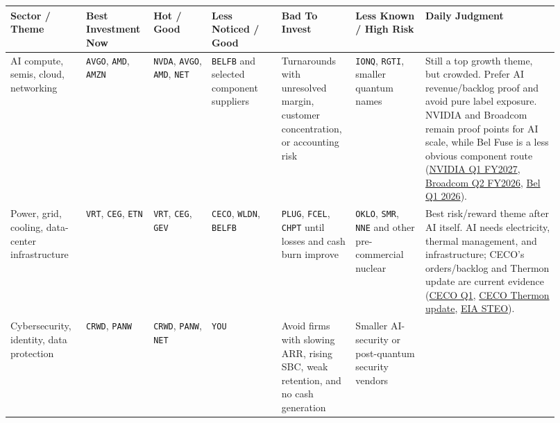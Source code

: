 \documentclass[
  9pt,
]{article}
\begin{document}
\scriptsize
\begin{longtable}[]{@{}L{0.13\linewidth}L{0.10\linewidth}L{0.10\linewidth}L{0.12\linewidth}L{0.12\linewidth}L{0.12\linewidth}L{0.23\linewidth}@{}}
\toprule
Sector / Theme & Best Investment Now & Hot / Good & Less Noticed / Good
& Bad To Invest & Less Known / High Risk & Daily Judgment \\
\midrule
\endhead
AI compute, semis, cloud, networking & \texttt{AVGO}, \texttt{AMD},
\texttt{AMZN} & \texttt{NVDA}, \texttt{AVGO}, \texttt{AMD}, \texttt{NET}
& \texttt{BELFB} and selected component suppliers & Turnarounds with
unresolved margin, customer concentration, or accounting risk &
\texttt{IONQ}, \texttt{RGTI}, smaller quantum names & Still a top growth
theme, but crowded. Prefer AI revenue/backlog proof and avoid pure label
exposure. NVIDIA and Broadcom remain proof points for AI scale, while
Bel Fuse is a less obvious component route
(\href{https://investor.nvidia.com/news/press-release-details/2026/NVIDIA-Announces-Financial-Results-for-First-Quarter-Fiscal-2027/default.aspx}{NVIDIA
Q1 FY2027},
\href{https://investors.broadcom.com/news-releases/news-release-details/broadcom-inc-announces-second-quarter-fiscal-year-2026-financial}{Broadcom
Q2 FY2026},
\href{https://ir.belfuse.com/news-releases/news-release-details/bel-reports-first-quarter-2026-results}{Bel
Q1 2026}). \\
Power, grid, cooling, data-center infrastructure & \texttt{VRT},
\texttt{CEG}, \texttt{ETN} & \texttt{VRT}, \texttt{CEG}, \texttt{GEV} &
\texttt{CECO}, \texttt{WLDN}, \texttt{BELFB} & \texttt{PLUG},
\texttt{FCEL}, \texttt{CHPT} until losses and cash burn improve &
\texttt{OKLO}, \texttt{SMR}, \texttt{NNE} and other pre-commercial
nuclear & Best risk/reward theme after AI itself. AI needs electricity,
thermal management, and infrastructure; CECO's orders/backlog and
Thermon update are current evidence
(\href{https://www.globenewswire.com/news-release/2026/04/28/3282406/0/en/ceco-environmental-reports-first-quarter-2026-results.html}{CECO
Q1},
\href{https://www.globenewswire.com/news-release/2026/06/09/3308707/0/en/ceco-environmental-provides-post-closing-update-on-thermon-transaction.html}{CECO
Thermon update}, \href{https://www.eia.gov/outlooks/steo/}{EIA
STEO}). \\
Cybersecurity, identity, data protection & \texttt{CRWD}, \texttt{PANW}
& \texttt{CRWD}, \texttt{PANW}, \texttt{NET} & \texttt{YOU} & Avoid
firms with slowing ARR, rising SBC, weak retention, and no cash
generation & Smaller AI-security or post-quantum security vendors &

\end{longtable}
\end{document}
